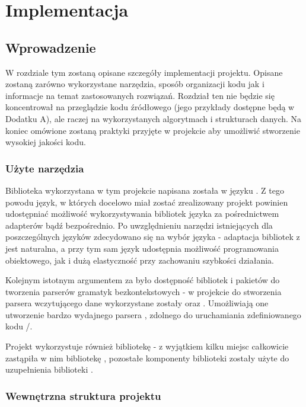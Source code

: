 \documentclass{standalone}
\begin{document}
\pagestyle{headings}

\chapter{Implementacja}

\section{Wprowadzenie}

W rozdziale tym zostaną opisane szczegóły implementacji projektu. Opisane zostaną zarówno wykorzystane
narzędzia, sposób organizacji kodu jak i informacje na temat zastosowanych rozwiązań. Rozdział ten nie będzie
się koncentrował na przeglądzie kodu źródłowego (jego przykłady dostępne będą w Dodatku A), ale raczej na
wykorzystanych algorytmach i strukturach danych. Na koniec omówione zostaną praktyki przyjęte w projekcie aby
umożliwić stworzenie wysokiej jakości kodu.

\subsection{Użyte narzędzia}

Biblioteka  wykorzystana w tym projekcie napisana została w języku . Z tego powodu język,
w których docelowo miał zostać zrealizowany projekt powinien udostępniać możliwość wykorzystywania bibliotek
języka  za pośrednictwem adapterów bądź bezpośrednio. Po uwzględnieniu narzędzi istniejących dla
poszczególnych języków zdecydowano się na wybór języka  - adaptacja bibliotek z  jest
naturalna, a przy tym sam język udostępnia możliwość programowania obiektowego, jak i dużą elastyczność przy
zachowaniu szybkości działania.

Kolejnym istotnym argumentem za  było dostępność bibliotek i pakietów do tworzenia parserów gramatyk
bezkontekstowych - w projekcie do stworzenia parsera wczytującego dane wykorzystane zostały  oraz
. Umożliwiają one utworzenie bardzo wydajnego parsera , zdolnego do uruchamiania
zdefiniowanego kodu /.

Projekt wykorzystuje również bibliotekę  - z wyjątkiem kilku miejsc  całkowicie
zastąpiła w nim bibliotekę , pozostałe komponenty biblioteki  zostały użyte do uzupełnienia
biblioteki .

\subsection{Wewnętrzna struktura projektu}
\end{document}
